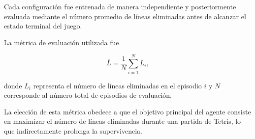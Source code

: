 Cada configuración fue entrenada de manera independiente y posteriormente evaluada mediante el número promedio de líneas eliminadas antes de alcanzar el estado terminal del juego.

La métrica de evaluación utilizada fue

\begin{equation}
\overline{L} = \frac{1}{N}
\sum_{i=1}^{N}
L_i,
\end{equation}

donde $L_i$ representa el número de líneas eliminadas en el episodio $i$ y $N$ corresponde al número total de episodios de evaluación.

La elección de esta métrica obedece a que el objetivo principal del agente consiste en maximizar el número de líneas eliminadas durante una partida de Tetris, lo que indirectamente prolonga la supervivencia.